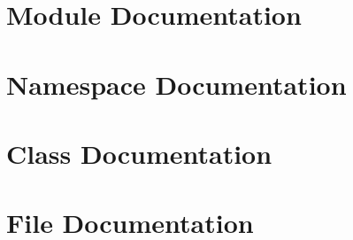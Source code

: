 \section{Module Documentation}





\section{Namespace Documentation}

\section{Class Documentation}





\section{File Documentation}

